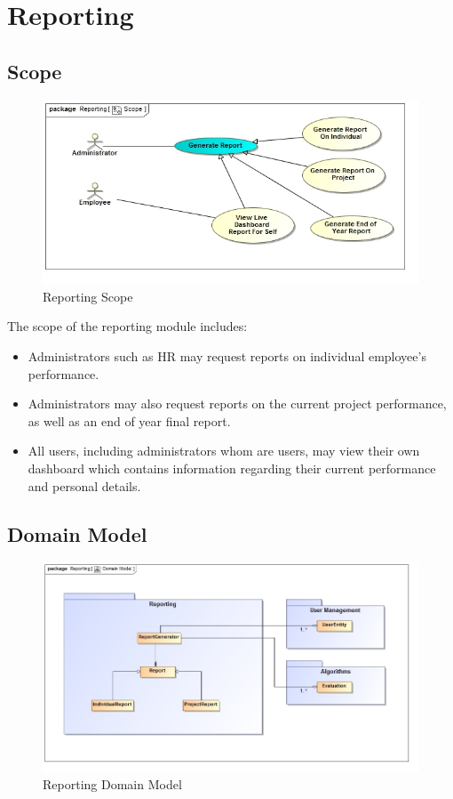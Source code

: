 \documentclass[11pt,a4paper]{article}
\begin{document}
\pagebreak

\section{Reporting}
\subsection{Scope}
\begin{figure}[H]
	\begin{center}
		\includegraphics[scale=0.75]{../Images/Reporting_Scope.jpg}
		\caption{Reporting Scope}
	\end{center}
\end{figure}
The scope of the reporting module includes:
\begin{itemize}
	\item Administrators such as HR may request reports on individual employee's performance.
	\item Administrators may also request reports on the current project performance, as well as an end of year final report.
	\item All users, including administrators whom are users, may view their own dashboard which contains information regarding their current performance and personal details.
\end{itemize}

\subsection{Domain Model}
\begin{figure}[H]
	\begin{center}
		\includegraphics[scale=0.55]{../Images/Report_Domain.jpg}
		\caption{Reporting Domain Model}
	\end{center}
\end{figure}
\end{document}

